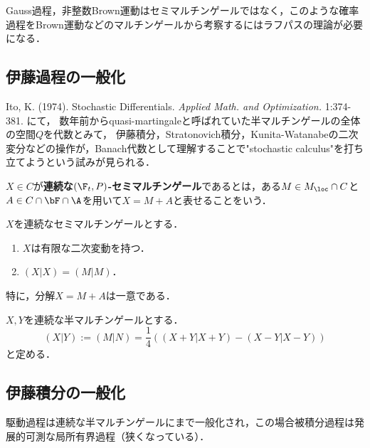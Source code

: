 \documentclass[uplatex,dvipdfmx]{jsreport}
\begin{document}
\begin{context}
    Gauss過程，非整数Brown運動はセミマルチンゲールではなく，このような確率過程をBrown運動などのマルチンゲールから考察するにはラフパスの理論が必要になる．
\end{context}

\subsection{伊藤過程の一般化}



\begin{history}
    Ito, K. (1974). Stochastic Differentials. \textit{Applied Math. and Optimization.} 1:374-381. にて，
    数年前からquasi-martingaleと呼ばれていた半マルチンゲールの全体の空間$Q$を代数とみて，
    伊藤積分，Stratonovich積分，Kunita-Watanabeの二次変分などの操作が，Banach代数として理解することで"stochastic calculus"を打ち立てようという試みが見られる．
\end{history}

\begin{definition}
    $X\in C$が\textbf{連続な$(\F_t,P)$-セミマルチンゲール}であるとは，ある$M\in M_\loc\cap C$と$A\in C\cap\bF\cap\A$を用いて$X=M+A$と表せることをいう．
\end{definition}

\begin{proposition}
    $X$を連続なセミマルチンゲールとする．
    \begin{enumerate}
        \item $X$は有限な二次変動を持つ．
        \item $(X|X)=(M|M)$．
    \end{enumerate}
    特に，分解$X=M+A$は一意である．
\end{proposition}

\begin{definition}
    $X,Y$を連続な半マルチンゲールとする．
    \[(X|Y):=(M|N)=\frac{1}{4}((X+Y|X+Y)-(X-Y|X-Y))\]
    と定める．
\end{definition}

\subsection{伊藤積分の一般化}

\begin{tcolorbox}[colframe=ForestGreen, colback=ForestGreen!10!white,breakable,colbacktitle=ForestGreen!40!white,coltitle=black,fonttitle=\bfseries\sffamily,
title=]
    駆動過程は連続な半マルチンゲールにまで一般化され，この場合被積分過程は発展的可測な局所有界過程（狭くなっている）．
\end{tcolorbox}
\end{document}
